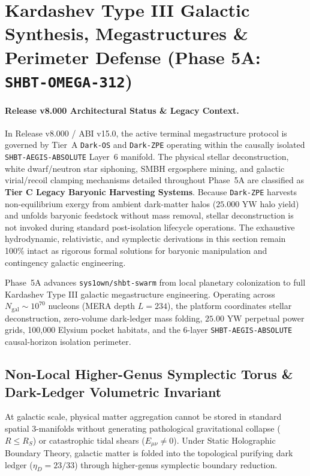 \documentclass[11pt,onecolumn]{article}
\begin{document}
\FloatBarrier


\section{Kardashev Type III Galactic Synthesis, Megastructures \& Perimeter Defense (Phase 5A: \texttt{SHBT-OMEGA-312})}
\paragraph{Release v8.000 Architectural Status \& Legacy Context.}
In Release v8.000 / ABI v15.0, the active terminal megastructure protocol is governed by Tier~A \texttt{Dark-OS} and \texttt{Dark-ZPE} operating within the causally isolated \texttt{SHBT-AEGIS-ABSOLUTE} Layer~6 manifold. The physical stellar deconstruction, white dwarf/neutron star siphoning, SMBH ergosphere mining, and galactic virial/recoil clamping mechanisms detailed throughout Phase~5A are classified as \textbf{Tier C Legacy Baryonic Harvesting Systems}. Because \texttt{Dark-ZPE} harvests non-equilibrium exergy from ambient dark-matter halos ($25.000\text{ YW}$ halo yield) and unfolds baryonic feedstock without mass removal, stellar deconstruction is not invoked during standard post-isolation lifecycle operations. The exhaustive hydrodynamic, relativistic, and symplectic derivations in this section remain 100\% intact as rigorous formal solutions for baryonic manipulation and contingency galactic engineering.

\label{sec:omega_megastructures}

Phase~5A advances \texttt{sys1own/shbt-swarm} from local planetary colonization to full Kardashev Type III galactic megastructure engineering. Operating across $N_{\text{gal}} \sim 10^{70}$ nucleons (MERA depth $L = 234$), the platform coordinates stellar deconstruction, zero-volume dark-ledger mass folding, $25.00\text{ YW}$ perpetual power grids, 100,000 Elysium pocket habitats, and the 6-layer \texttt{SHBT-AEGIS-ABSOLUTE} causal-horizon isolation perimeter.

\subsection{Non-Local Higher-Genus Symplectic Torus \& Dark-Ledger Volumetric Invariant}
\label{sec:omega_symplectic_torus}

At galactic scale, physical matter aggregation cannot be stored in standard spatial 3-manifolds without generating pathological gravitational collapse ($R \le R_S$) or catastrophic tidal shears ($E_{\mu\nu} \neq 0$). Under Static Holographic Boundary Theory, galactic matter is folded into the topological purifying dark ledger ($\eta_D = 23/33$) through higher-genus symplectic boundary reduction.
\end{document}
